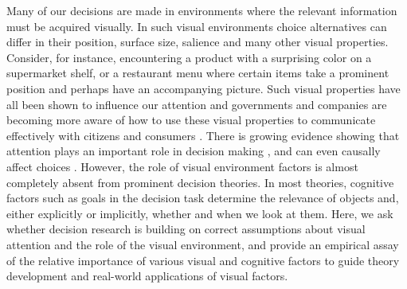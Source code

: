 \documentclass[english,natbib,man,floatsintext]{apa6}
\begin{document}
Many of our decisions are made in environments where the relevant information must be acquired visually. In such visual environments choice alternatives can differ in their position, surface size, salience and many other visual properties. Consider, for instance, encountering a product with a surprising color on a supermarket shelf, or a restaurant menu where certain items take a prominent position and perhaps have an accompanying picture. Such visual properties have all been shown to influence our attention \citep{corbetta2002a,borji2012a,dehaene2003a,clarke2014a, rosenholtz2007a} and governments and companies are becoming more aware of how to use these visual properties to communicate effectively with citizens and consumers \citep{orquinwedel2020}. There is growing evidence showing that attention plays an important role in decision making \citep{gidloef2017a,krajbich2010a, stojic2020uncertainty, callaway2019a, gluth2018, gluth2020}, and can even causally affect choices \citep{ghaffari2018a, paernamets2015a, shimojo2003a}. However, the role of visual environment factors is almost completely absent from prominent decision theories. In most theories, cognitive factors such as goals in the decision task determine the relevance of objects and, either explicitly or implicitly, whether and when we look at them. Here, we ask whether decision research is building on correct assumptions about visual attention and the role of the visual environment, and provide an empirical assay of the relative importance of various visual and cognitive factors to guide theory development and real-world applications of visual factors.\\
\end{document}
